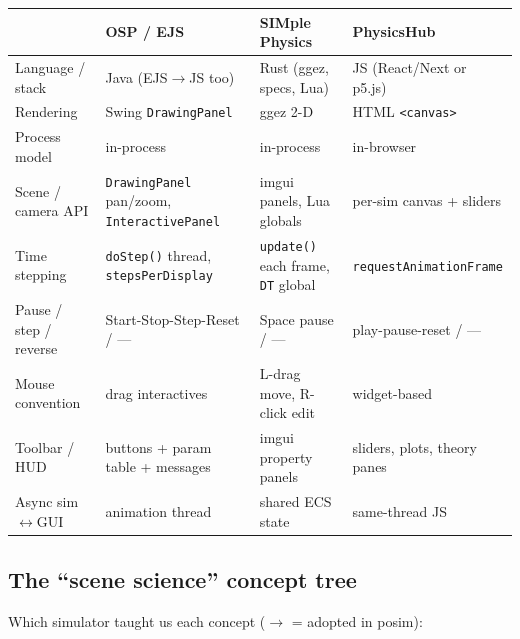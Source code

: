 \documentclass[11pt]{article}
\newcommand{\code}[1]{\texttt{#1}}
\begin{document}
\begin{center}\small
\begin{tabular}{lp{3.6cm}p{3.6cm}p{3.6cm}}
 & \textbf{OSP / EJS} & \textbf{SIMple Physics} & \textbf{PhysicsHub}\\\hline
Language / stack & Java (EJS$\to$JS too) & Rust (ggez, specs, Lua) & JS (React/Next or p5.js)\\
Rendering & Swing \code{DrawingPanel} & ggez 2-D & HTML \code{<canvas>}\\
Process model & in-process & in-process & in-browser\\
Scene / camera API & \code{DrawingPanel} pan/zoom, \code{InteractivePanel} & imgui panels, Lua globals & per-sim canvas + sliders\\
Time stepping & \code{doStep()} thread, \code{stepsPerDisplay} & \code{update()} each frame, \code{DT} global & \code{requestAnimationFrame}\\
Pause / step / reverse & Start-Stop-Step-Reset / --- & Space pause / --- & play-pause-reset / ---\\
Mouse convention & drag interactives & L-drag move, R-click edit & widget-based\\
Toolbar / HUD & buttons + param table + messages & imgui property panels & sliders, plots, theory panes\\
Async sim$\leftrightarrow$GUI & animation thread & shared ECS state & same-thread JS\\
\end{tabular}
\end{center}

\subsection{The ``scene science'' concept tree}

Which simulator taught us each concept ($\to$ = adopted in posim):
\end{document}
